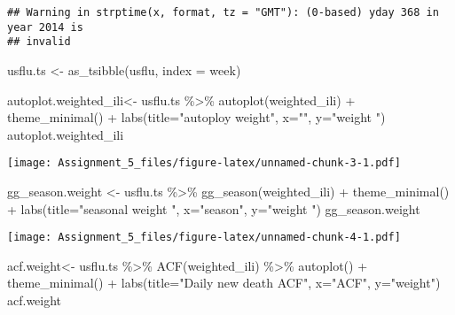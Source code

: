 \documentclass[
]{article}
\newenvironment{Shaded}{\begin{snugshade}}{\end{snugshade}}
\newcommand{\AttributeTok}[1]{\textcolor[rgb]{0.77,0.63,0.00}{#1}}
\newcommand{\FunctionTok}[1]{\textcolor[rgb]{0.00,0.00,0.00}{#1}}
\newcommand{\NormalTok}[1]{#1}
\newcommand{\OtherTok}[1]{\textcolor[rgb]{0.56,0.35,0.01}{#1}}
\newcommand{\SpecialCharTok}[1]{\textcolor[rgb]{0.00,0.00,0.00}{#1}}
\newcommand{\StringTok}[1]{\textcolor[rgb]{0.31,0.60,0.02}{#1}}
\begin{document}
\begin{verbatim}
## Warning in strptime(x, format, tz = "GMT"): (0-based) yday 368 in year 2014 is
## invalid
\end{verbatim}

\begin{Shaded}
\begin{Highlighting}[]
\NormalTok{usflu.ts }\OtherTok{\textless{}{-}} \FunctionTok{as\_tsibble}\NormalTok{(usflu, }\AttributeTok{index =}\NormalTok{ week)}
\end{Highlighting}
\end{Shaded}

\begin{Shaded}
\begin{Highlighting}[]
\NormalTok{autoplot.weighted\_ili}\OtherTok{\textless{}{-}}\NormalTok{ usflu.ts }\SpecialCharTok{\%\textgreater{}\%} \FunctionTok{autoplot}\NormalTok{(weighted\_ili) }\SpecialCharTok{+} \FunctionTok{theme\_minimal}\NormalTok{() }\SpecialCharTok{+} 
  \FunctionTok{labs}\NormalTok{(}\AttributeTok{title=}\StringTok{"autoploy weight"}\NormalTok{,}
       \AttributeTok{x=}\StringTok{""}\NormalTok{, }\AttributeTok{y=}\StringTok{"weight "}\NormalTok{)}
\NormalTok{autoplot.weighted\_ili}
\end{Highlighting}
\end{Shaded}

\texttt{[image: Assignment\_5\_files/figure-latex/unnamed-chunk-3-1.pdf]}

\begin{Shaded}
\begin{Highlighting}[]
\NormalTok{gg\_season.weight }\OtherTok{\textless{}{-}}\NormalTok{ usflu.ts }\SpecialCharTok{\%\textgreater{}\%} \FunctionTok{gg\_season}\NormalTok{(weighted\_ili) }\SpecialCharTok{+} \FunctionTok{theme\_minimal}\NormalTok{() }\SpecialCharTok{+} 
  \FunctionTok{labs}\NormalTok{(}\AttributeTok{title=}\StringTok{"seasonal weight "}\NormalTok{, }\AttributeTok{x=}\StringTok{"season"}\NormalTok{, }\AttributeTok{y=}\StringTok{"weight "}\NormalTok{)}
\NormalTok{gg\_season.weight}
\end{Highlighting}
\end{Shaded}

\texttt{[image: Assignment\_5\_files/figure-latex/unnamed-chunk-4-1.pdf]}

\begin{Shaded}
\begin{Highlighting}[]
\NormalTok{acf.weight}\OtherTok{\textless{}{-}}\NormalTok{ usflu.ts }\SpecialCharTok{\%\textgreater{}\%} \FunctionTok{ACF}\NormalTok{(weighted\_ili) }\SpecialCharTok{\%\textgreater{}\%}
  \FunctionTok{autoplot}\NormalTok{() }\SpecialCharTok{+} \FunctionTok{theme\_minimal}\NormalTok{() }\SpecialCharTok{+} \FunctionTok{labs}\NormalTok{(}\AttributeTok{title=}\StringTok{"Daily new death ACF"}\NormalTok{,}
                         \AttributeTok{x=}\StringTok{"ACF"}\NormalTok{, }\AttributeTok{y=}\StringTok{"weight"}\NormalTok{)}
\NormalTok{acf.weight}
\end{Highlighting}
\end{Shaded}
\end{document}
